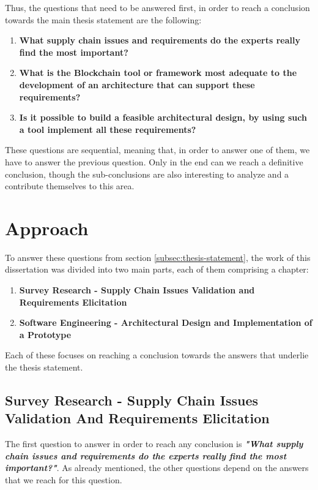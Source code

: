 Thus, the questions that need to be answered first, in order to reach a conclusion towards the main thesis statement are the following:
\begin{enumerate}
\item \textbf{What supply chain issues and requirements do the experts really find the most important?}
\item \textbf{What is the Blockchain tool or framework most adequate to the development of an architecture that can support these requirements?}
\item \textbf{Is it possible to build a feasible architectural design, by using such a tool implement all these requirements?}
\end{enumerate}

These questions are sequential, meaning that, in order to answer one of them, we have to answer the previous question. Only in the end can we reach a definitive conclusion, though the sub-conclusions are also interesting to analyze and a contribute themselves to this area.

\section{Approach}


To answer these questions from section \ref{subsec:thesis-statement}, the work of this dissertation was divided into two main parts, each of them comprising a chapter:
\begin{enumerate}
\item \textbf{Survey Research - Supply Chain Issues Validation and Requirements Elicitation}
\item \textbf{Software Engineering - Architectural Design and Implementation of a Prototype}
\end{enumerate}

Each of these focuses on reaching a conclusion towards the answers that underlie the thesis statement.

\subsection{Survey Research - Supply Chain Issues Validation And Requirements Elicitation}
\label{sec:survey-approach}
The first question to answer in order to reach any conclusion is \textbf{\textit{"What supply chain issues and requirements do the experts really find the most important?"}}. As already mentioned, the other questions depend on the answers that we reach for this question.

